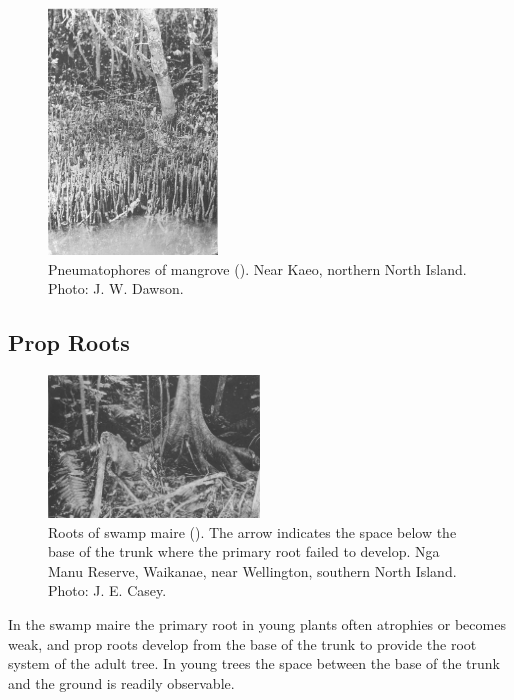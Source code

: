 \begin{figure}
	\includegraphics[width=0.4\textwidth]{graphics/figure13mangrove.jpg}
	\centering
	\caption[Pneumatophores of mangrove]{Pneumatophores of mangrove ().
    Near Kaeo, northern North Island.
    Photo:  J. W. Dawson.}
	\label{fig:13mangrove}
\end{figure}

\subsection{Prop Roots}

\begin{figure}
	\includegraphics[width=0.5\textwidth]{graphics/figure14swampmaire.jpg}
	\centering
	\caption[Roots of swamp maire]{Roots of swamp maire ().
    The arrow indicates the space below the base of the trunk where the primary root failed to develop.
    Nga Manu Reserve, Waikanae, near Wellington, southern North Island.
    Photo:  J. E. Casey.}
	\label{fig:14swampmaire}
\end{figure}

In the swamp maire the primary root in young plants often atrophies or becomes weak, and prop roots develop from the base of the trunk to provide the root system of the adult tree.
In young trees the space between the base of the trunk and the ground is readily observable.

